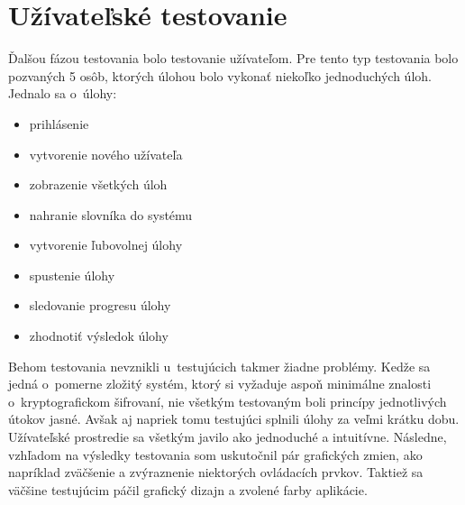 \documentclass[slovak]{fitthesis}
\begin{document}
\section{Užívateľské testovanie}
Ďalšou fázou testovania bolo testovanie užívateľom. Pre tento typ testovania bolo pozvaných 5 osôb, ktorých úlohou bolo vykonať niekoľko jednoduchých úloh. Jednalo sa o~úlohy:
\begin{itemize}
    \item prihlásenie
    \item vytvorenie nového užívateľa
    \item zobrazenie všetkých úloh
    \item nahranie slovníka do systému
    \item vytvorenie ľubovolnej úlohy
    \item spustenie úlohy
    \item sledovanie progresu úlohy
    \item zhodnotiť výsledok úlohy
\end{itemize}
Behom testovania nevznikli u~testujúcich takmer žiadne problémy. Kedže sa jedná o~pomerne zložitý systém, ktorý si vyžaduje aspoň minimálne znalosti o~kryptografickom šifrovaní, nie všetkým testovaným boli princípy jednotlivých útokov jasné. Avšak aj napriek tomu testujúci splnili úlohy za veľmi krátku dobu. Užívateľské prostredie sa všetkým javilo ako jednoduché a intuitívne. Následne, vzhľadom na výsledky testovania som uskutočnil pár grafických zmien, ako napríklad zväčšenie a zvýraznenie niektorých ovládacích prvkov. Taktiež sa väčšine testujúcim páčil grafický dizajn a zvolené farby aplikácie.  
\end{document}
